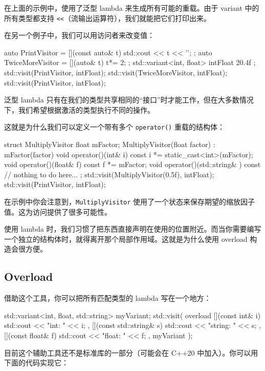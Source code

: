 在上面的示例中，使用了泛型 lambda 来生成所有可能的重载。由于 variant 中的所有类型都支持 \texttt{<<}（流输出运算符），我们就能把它们打印出来。

在另一个例子中，我们可以用访问者来改变值：

\begin{codebox}[cpp]
auto PrintVisitor = [](const auto& t) { std::cout << t << '\n'; };
auto TwiceMoreVisitor = [](auto& t) { t*= 2; };
std::variant<int, float> intFloat { 20.4f };
std::visit(PrintVisitor, intFloat);
std::visit(TwiceMoreVisitor, intFloat);
std::visit(PrintVisitor, intFloat);
\end{codebox}

泛型 lambda 只有在我们的类型共享相同的“接口”时才能工作，但在大多数情况下，我们希望根据激活的类型执行不同的操作。

这就是为什么我们可以定义一个带有多个 \texttt{operator()} 重载的结构体：

\begin{codebox}[cpp]
struct MultiplyVisitor
{
float mFactor;
MultiplyVisitor(float factor) : mFactor(factor) { }
void operator()(int& i) const {
i *= static_cast<int>(mFactor);
}
void operator()(float& f) const {
f *= mFactor;
}
void operator()(std::string& ) const {
// nothing to do here...
}
};
std::visit(MultiplyVisitor(0.5f), intFloat);
std::visit(PrintVisitor, intFloat);
\end{codebox}

在示例中你会注意到，\texttt{MultiplyVisitor} 使用了一个状态来保存期望的缩放因子值。这为访问提供了很多可能性。

使用 lambda 时，我们习惯了把东西直接声明在使用的位置附近。而当你需要编写一个独立的结构体时，就得离开那个局部作用域。这就是为什么使用 overload 构造会很方便。

\subsection{Overload}

借助这个工具，你可以把所有匹配类型的 lambda 写在一个地方：

\begin{codebox}[cpp]
std::variant<int, float, std::string> myVariant;
std::visit(
overload {
[](const int& i) { std::cout << "int: " << i; },
[](const std::string& s) { std::cout << "string: " << s; },
[](const float& f) { std::cout << "float: " << f; }
},
myVariant
);
\end{codebox}

目前这个辅助工具还不是标准库的一部分（可能会在 C++20 中加入）。你可以用下面的代码实现它：

